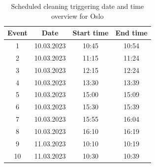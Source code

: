 \begin{table}[H]
\centering
\caption{Scheduled cleaning triggering date and time overview for Oslo}
\label{tab:SC_dateandtimeOslo}
\begin{tabular}{|c|c|c|c|}
\hline
\textbf{Event} & \textbf{Date} & \textbf{Start time} & \textbf{End time} \\ \hline
1              & 10.03.2023         & 10:45               & 10:54             \\ \hline
2              & 10.03.2023         & 11:15               & 11:24             \\ \hline
3              & 10.03.2023         & 12:15               & 12:24             \\ \hline
4              & 10.03.2023         & 13:30               & 13:39             \\ \hline
5              & 10.03.2023         & 15:00               & 15:09             \\ \hline
6              & 10.03.2023         & 15:30               & 15:39             \\ \hline
7              & 10.03.2023         & 15:55               & 16:04             \\ \hline
8              & 10.03.2023         & 16:10               & 16:19             \\ \hline
9              & 11.03.2023         & 10:10               & 10:19             \\ \hline
10             & 11.03.2023         & 10:30               & 10:39             \\ \hline
\end{tabular}
\end{table}

